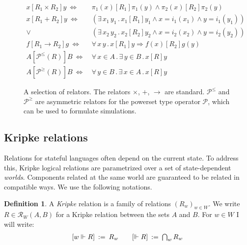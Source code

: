 \documentclass[11pt,oneside,draft]{book}
\theoremstyle{definition}
\newtheorem{definition}[theorem]{Definition}
\newcommand{\ifr}[1]{\mathrel{[{#1}]}}
\newcommand{\figsize}{}
\begin{document}
\begin{figure} %
  \figsize
  \begin{align*}
    x \ifr{R_1 \times R_2} y \ \Leftrightarrow\  &
      \pi_1(x) \ifr{R_1} \pi_1(y) \wedge
      \pi_2(x) \ifr{R_2} \pi_2(y) \\
    x \ifr{R_1 + R_2} y \ \Leftrightarrow\  &
      (\exists \, x_1 \, y_1 \,.\,
        x_1 \ifr{R_1} y_1 \wedge
        x = i_1(x_1) \wedge
        y = i_1(y_1)) \\ \vee\ &
      (\exists \, x_2 \, y_2 \,.\,
        x_2 \ifr{R_2} y_2 \wedge
        x = i_2(x_2) \wedge
        y = i_2(y_2)) \\
    f \ifr{R_1 \rightarrow R_2} g \ \Leftrightarrow\  &
      \forall \, x \, y \,.\,
        x \ifr{R_1} y \Rightarrow
        f(x) \ifr{R_2} g(y) \\
    A \ifr{\mathcal{P}^\le(R)} B \ \Leftrightarrow\  &
      \forall \, x \in A \,.\,
      \exists \, y \in B \,.\,
      x \ifr{R} y \\
    A \ifr{\mathcal{P}^\ge(R)} B \ \Leftrightarrow\  &
      \forall \, y \in B \,.\,
      \exists \, x \in A \,.\,
      x \ifr{R} y
  \end{align*}
  \caption[A selection of relators]%
   {A selection of relators.
    The relators $\times$, $+$, $\rightarrow$ are standard.
    $\mathcal{P}^\le$ and $\mathcal{P}^\ge$ are asymmetric
    relators for the powerset type operator $\mathcal{P}$,
    which can be used to formulate simulations.
    }
  \label{fig:relators}
\end{figure}


\subsection{Kripke relations} \label{sec:klr} %

Relations for stateful languages
often depend on the current state.
To address this,
Kripke logical relations
are parametrized over a set of state-dependent \emph{worlds}.
Components related at the same world
are guaranteed to be related in compatible ways.
We use the following notations.

\begin{definition} \label{def:klr} %
A \emph{Kripke} relation is
a family of relations $(R_w)_{w \in W}$.
We write $R \in \mathcal{R}_W(A, B)$
for a Kripke relation between the sets $A$ and $B$.
For $w \in W$ I will write:
\[
\begin{array}{c@{\qquad}c}
    [w \Vdash R] \: := \: R_w &
    [\Vdash R] \: := \: \bigcap_{w} R_w
\end{array}
\]
\end{definition}
\end{document}
